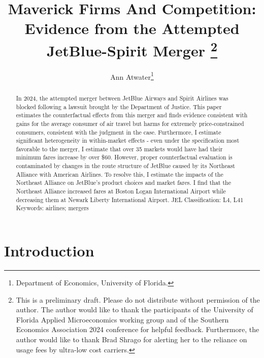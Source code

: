 \documentclass{article}
\author{Ann Atwater\footnote{Department of Economics, University of Florida.}}
\title{Maverick Firms And Competition: Evidence from the Attempted JetBlue-Spirit Merger \footnote{This is a preliminary draft. Please do not distribute without permission of the author. The author would like to thank the participants of the University of Florida Applied Microeconomics working group and of the Southern Economics Association 2024 conference for helpful feedback. Furthermore, the author would like to thank Brad Shrago for alerting her to the reliance on usage fees by ultra-low cost carriers. }}
\begin{document}
	\maketitle
	
	\begin{abstract}
In 2024, the attempted merger between JetBlue Airways and Spirit Airlines was blocked following a lawsuit brought by the Department of Justice. This paper estimates the counterfactual effects from this merger and finds evidence consistent with gains for the average consumer of air travel but harms for extremely price-constrained consumers, consistent with the judgment in the case. Furthermore, I estimate significant heterogeneity in within-market effects - even under the specification most favorable to the merger, I estimate that over 35 markets would have had their minimum fares increase by over \$60. However, proper counterfactual evaluation is contaminated by changes in the route structure of JetBlue caused by its Northeast Alliance with American Airlines. To resolve this, I estimate the impacts of the Northeast Alliance on JetBlue's product choices and market fares. I find that the Northeast Alliance increased fares at Boston Logan International Airport while decreasing them at Newark Liberty International Airport. \bigskip
	\noindent JEL Classification: L4, L41 \newline
	\noindent Keywords: airlines; mergers
		
	\end{abstract}
	
	\pagebreak
	
	\doublespacing
	
	\section{Introduction}
	\label{sec:Introduction} 
    
\end{document}
